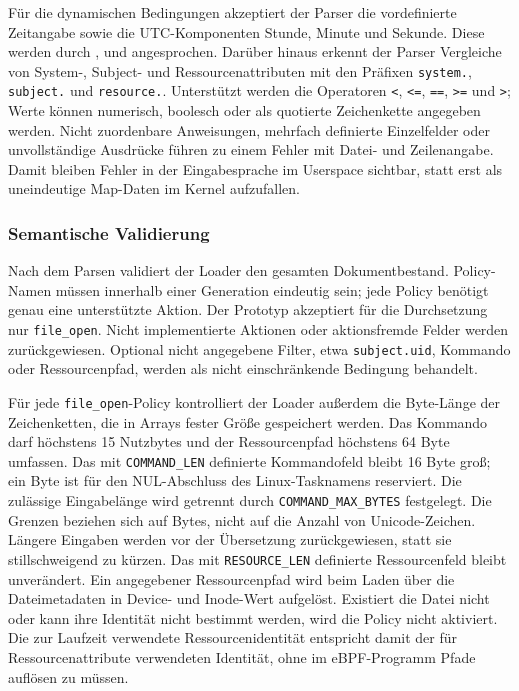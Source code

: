 Für die dynamischen Bedingungen akzeptiert der Parser die vordefinierte Zeitangabe  sowie die UTC-Komponenten Stunde, Minute und Sekunde. Diese werden durch ,  und  angesprochen. Darüber hinaus erkennt der Parser Vergleiche von System-, Subject- und Ressourcenattributen mit den Präfixen \texttt{system.}, \texttt{subject.} und \texttt{resource.}. Unterstützt werden die Operatoren \texttt{<}, \texttt{<=}, \texttt{==}, \texttt{>=} und \texttt{>}; Werte können numerisch, boolesch oder als quotierte Zeichenkette angegeben werden. Nicht zuordenbare Anweisungen, mehrfach definierte Einzelfelder oder unvollständige Ausdrücke führen zu einem Fehler mit Datei- und Zeilenangabe. Damit bleiben Fehler in der Eingabesprache im Userspace sichtbar, statt erst als uneindeutige Map-Daten im Kernel aufzufallen.

\subsubsection{Semantische Validierung}
Nach dem Parsen validiert der Loader den gesamten Dokumentbestand. Policy-Namen müssen innerhalb einer Generation eindeutig sein; jede Policy benötigt genau eine unterstützte Aktion. Der Prototyp akzeptiert für die Durchsetzung nur \texttt{file\_open}. Nicht implementierte Aktionen oder aktionsfremde Felder werden zurückgewiesen. Optional nicht angegebene Filter, etwa \texttt{subject.uid}, Kommando oder Ressourcenpfad, werden als nicht einschränkende Bedingung behandelt.

Für jede \texttt{file\_open}-Policy kontrolliert der Loader außerdem die Byte-Länge der Zeichenketten, die in Arrays fester Größe gespeichert werden. Das Kommando darf höchstens 15 Nutzbytes und der Ressourcenpfad höchstens 64 Byte umfassen. Das mit \texttt{COMMAND\_LEN} definierte Kommandofeld bleibt 16 Byte groß; ein Byte ist für den NUL-Abschluss des Linux-Tasknamens reserviert. Die zulässige Eingabelänge wird getrennt durch \texttt{COMMAND\_MAX\_BYTES} festgelegt. Die Grenzen beziehen sich auf Bytes, nicht auf die Anzahl von Unicode-Zeichen. Längere Eingaben werden vor der Übersetzung zurückgewiesen, statt sie stillschweigend zu kürzen. Das mit \texttt{RESOURCE\_LEN} definierte Ressourcenfeld bleibt unverändert. Ein angegebener Ressourcenpfad wird beim Laden über die Dateimetadaten in Device- und Inode-Wert aufgelöst. Existiert die Datei nicht oder kann ihre Identität nicht bestimmt werden, wird die Policy nicht aktiviert. Die zur Laufzeit verwendete Ressourcenidentität entspricht damit der für Ressourcenattribute verwendeten Identität, ohne im eBPF-Programm Pfade auflösen zu müssen.

